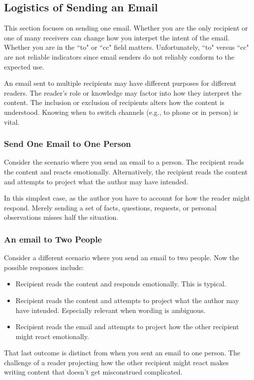 
\subsection*{Logistics of Sending an Email\label{sec:sending_email}}


This section focuses on sending one email. Whether you are the only recipient or one of many receivers can change how you interpet the intent of the email. Whether you are in the ``to" or ``cc" field matters. Unfortunately, ``to" versus ``cc" are not reliable indicators since email senders do not reliably conform to the expected use. 


An email sent to multiple recipients may have different purposes for different readers. The reader's role or knowledge may factor into how they interpret the content. The inclusion or exclusion of recipients alters how the content is understood.  Knowing when to switch channels (e.g., to phone or in person) is vital.

\subsubsection*{Send One Email to One Person}

Consider the scenario where you send an email to a person. 
The recipient reads the content and reacts emotionally.
Alternatively, the recipient reads the content and attempts to project what the author may have intended.

In this simplest case, as the author you have to account for how the reader might respond. Merely sending a set of facts, questions, requests, or personal observations misses half the situation.


\subsubsection*{An email to Two People}
Consider a different scenario where you send an email to two people. Now the possible responses include:
\begin{itemize}
\item Recipient reads the content and responds emotionally. This is typical.
\item Recipient reads the content and attempts to project what the author may have intended. Especially relevant when wording is ambiguous.
\item Recipient reads the email and attempts to project how the other recipient might react emotionally.
\end{itemize}
That last outcome is distinct from when you sent an email to one person. The challenge of a reader projecting how the other recipient might react makes writing content that doesn't get misconstrued complicated. 

